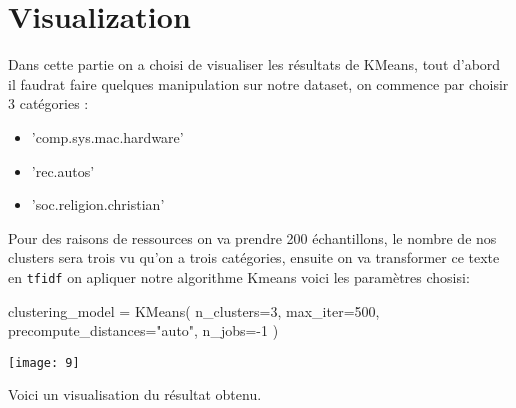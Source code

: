\documentclass[english,a4paper,11pt,oneside]{article}
\begin{document}
	\section{Visualization}{
		Dans cette partie on a choisi de visualiser les résultats de KMeans, tout d'abord il faudrat faire quelques manipulation sur notre dataset, on commence par choisir 3 catégories :\\
		\begin{itemize}
			\item 'comp.sys.mac.hardware'
			\item 'rec.autos'
			\item 'soc.religion.christian'
		\end{itemize}
		Pour des raisons de ressources on va prendre 200 échantillons, le nombre de nos clusters sera trois vu qu'on a trois catégories, ensuite on va transformer ce texte en \texttt{tfidf} on apliquer notre algorithme Kmeans voici les paramètres chosisi:\\
		\begin{pythonn}
			clustering_model = KMeans(
			n_clusters=3,
			max_iter=500,
			precompute_distances="auto",
			n_jobs=-1
			)
		\end{pythonn}
		
		\texttt{[image: 9]}
		
		Voici un visualisation du résultat obtenu.
		
		
	}
\end{document}
